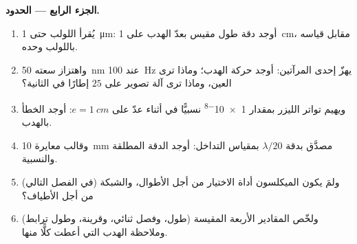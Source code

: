 \begin{problem}
\medskip
\noindent\textbf{الجزء الرابع --- الحدود.}
\begin{enumerate}[resume]
  \item يُقرأ اللولب حتى \qty{1}{\micro m}: أوجد دقة طول
        مقيس بعدّ الهدب على \qty{1}{cm}، مقابل قياسه باللولب
        وحده.
  \item واهتزاز سعته \qty{50}{nm} عند \qty{100}{Hz} يهزّ إحدى
        المرآتين: أوجد حركة الهدب؛ وماذا ترى العين، وماذا ترى
        آلة تصوير على $25$ إطارًا في الثانية؟
  \item ويهيم تواتر الليزر بمقدار \qty{1e-8}{} نسبيًّا
        في أثناء عدّ على $e = \qty{1}{cm}$: أوجد الخطأ بالهدب.
  \item وقالب معايرة \qty{10}{mm} مصدَّق بدقة $\lambda/20$
        بمقياس التداخل: أوجد الدقة المطلقة والنسبية.
  \item ولمَ يكون الميكلسون أداة الاختيار من أجل الأطوال،
        والشبكة (في الفصل التالي) من أجل الأطياف؟
  \item ولخّص المقادير الأربعة المقيسة (طول، وفصل ثنائي،
        وقرينة، وطول ترابط) وملاحظة الهدب
        التي أعطت كلًّا منها.
\end{enumerate}
\end{problem}

